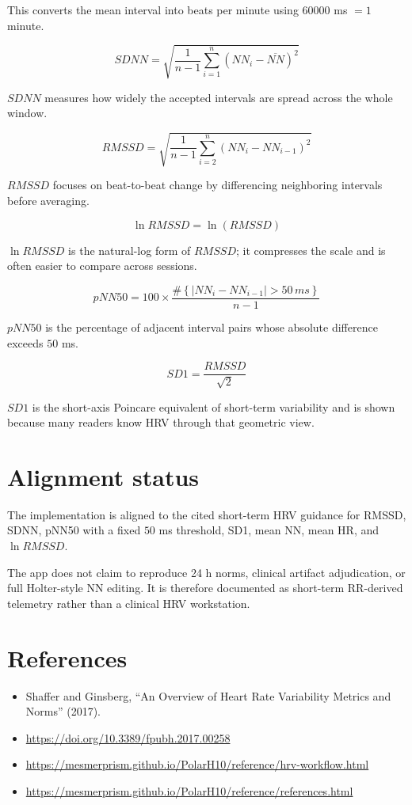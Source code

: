 \documentclass[11pt]{article}
\begin{document}
This converts the mean interval into beats per minute using $60000$ ms $= 1$
minute.

\[
SDNN = \sqrt{\frac{1}{n-1}\sum_{i=1}^{n}(NN_i - \overline{NN})^2}
\]

$SDNN$ measures how widely the accepted intervals are spread across the whole
window.

\[
RMSSD = \sqrt{\frac{1}{n-1}\sum_{i=2}^{n}(NN_i - NN_{i-1})^2}
\]

$RMSSD$ focuses on beat-to-beat change by differencing neighboring intervals
before averaging.

\[
\ln RMSSD = \ln(RMSSD)
\]

$\ln RMSSD$ is the natural-log form of $RMSSD$; it compresses the scale and is
often easier to compare across sessions.

\[
pNN50 = 100 \times
\frac{\#\left\{|NN_i - NN_{i-1}| > 50\,ms\right\}}{n-1}
\]

$pNN50$ is the percentage of adjacent interval pairs whose absolute difference
exceeds $50$ ms.

\[
SD1 = \frac{RMSSD}{\sqrt{2}}
\]

$SD1$ is the short-axis Poincare equivalent of short-term variability and is
shown because many readers know HRV through that geometric view.

\section*{Alignment status}

The implementation is aligned to the cited short-term HRV guidance for RMSSD,
SDNN, pNN50 with a fixed $50$ ms threshold, SD1, mean NN, mean HR, and
$\ln RMSSD$.

The app does not claim to reproduce 24 h norms, clinical artifact adjudication,
or full Holter-style NN editing. It is therefore documented as short-term
RR-derived telemetry rather than a clinical HRV workstation.

\section*{References}

\begin{itemize}[leftmargin=1.5em]
\item Shaffer and Ginsberg, ``An Overview of Heart Rate Variability Metrics and Norms'' (2017).
\item \url{https://doi.org/10.3389/fpubh.2017.00258}
\item \url{https://mesmerprism.github.io/PolarH10/reference/hrv-workflow.html}
\item \url{https://mesmerprism.github.io/PolarH10/reference/references.html}
\end{itemize}
\end{document}
